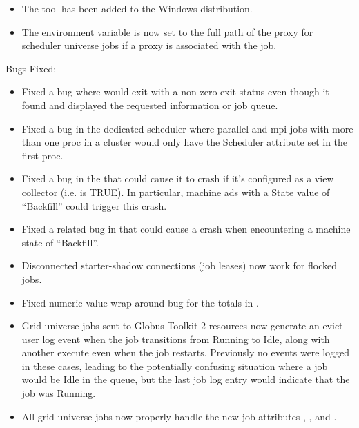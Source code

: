 \begin{itemize}
\item The  tool has been added to the Windows
distribution.


\item
{}
The environment variable  is now set to the
full path of the proxy for scheduler universe jobs if a proxy is
associated with the job.

\end{itemize}


\noindent Bugs Fixed:

\begin{itemize}

\item Fixed a bug where  would exit with a non-zero exit status
even though it found and displayed the requested information or job queue.

\item Fixed a bug in the dedicated scheduler where parallel and mpi
jobs with more than one proc in a cluster would only have the
Scheduler attribute set in the first proc.

\item Fixed a bug in the  that could cause it to
crash if it's configured as a view collector
(i.e.  is TRUE).  In particular, machine
ads with a State value of ``Backfill'' could trigger this crash.
\item Fixed a related bug in  that could cause a crash
when encountering a machine state of ``Backfill''.

\item Disconnected starter-shadow connections (job leases) now work for flocked jobs.

\item Fixed numeric value wrap-around bug for the totals in .

\item Grid universe jobs sent to Globus Toolkit 2 resources now
generate an evict user log event when the job transitions from Running
to Idle, along with another execute even when the job restarts.  Previously
no events were logged in these cases, leading to the potentially confusing
situation where a job would be Idle in the queue, but the last job log entry
would indicate that the job was Running.

\item All grid universe jobs now properly handle the new job attributes
, , and .


\end{itemize}
